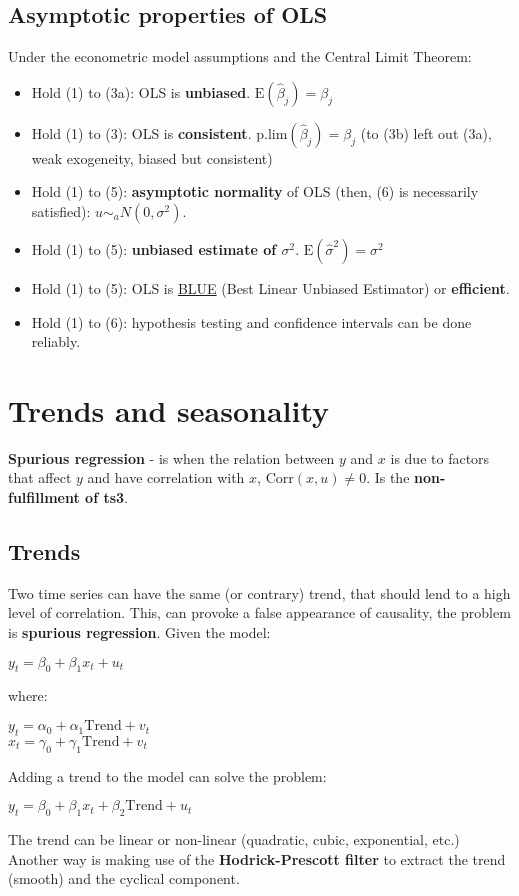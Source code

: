 \documentclass[10pt, a4paper, landscape]{extarticle}
\newcommand{\E}{\mathrm{E}}
\newcommand{\Corr}{\mathrm{Corr}}
\begin{document}
\begin{multicols}{3}
	\subsection*{Asymptotic properties of OLS}
		Under the econometric model assumptions and the Central Limit Theorem:
		\begin{itemize}[leftmargin=*]
			\item Hold (1) to (3a): OLS is \textbf{unbiased}. $\E(\hat{\beta}_j) = \beta_j$
			\item Hold (1) to (3): OLS is \textbf{consistent}. $\mathrm{p.lim}(\hat{\beta}_j) = \beta_j$ (to (3b) left out (3a), weak exogeneity, biased but consistent)
			\item Hold (1) to (5): \textbf{asymptotic normality} of OLS (then, (6) is necessarily satisfied): $u \sim_a N(0,\sigma^2)$.
			\item Hold (1) to (5): \textbf{unbiased estimate of $\sigma^2$}. $\E(\hat{\sigma}^2) = \sigma^2$
			\item Hold (1) to (5): OLS is \textcolor{blue}{\href{https://www.youtube.com/watch?v=68ugkg9RePc}{BLUE}} (Best Linear Unbiased Estimator) or \textbf{efficient}. 
			\item Hold (1) to (6): hypothesis testing and confidence intervals can be done reliably.
		\end{itemize}
\columnbreak
\section*{Trends and seasonality}
	\textbf{Spurious regression} - is when the relation between $y$ and $x$ is due to factors that affect $y$ and have correlation with $x$, $\Corr(x, u) \neq 0$. Is the \textbf{non-fulfillment of ts3}.
	\subsection*{Trends}
		Two time series can have the same (or contrary) trend, that should lend to a high level of correlation. This, can provoke a false appearance of causality, the problem is \textbf{spurious regression}. Given the model:
		\begin{center}
			$y_t = \beta_0 + \beta_1 x_t + u_t$
		\end{center}
		where:
		\begin{center}
			$y_t = \alpha_0 + \alpha_1 \mathrm{Trend} + v_t$ \\
			$x_t = \gamma_0 + \gamma_1 \mathrm{Trend} + v_t$
		\end{center}
		Adding a trend to the model can solve the problem:
		\begin{center}
			$y_t = \beta_0 + \beta_1 x_t + \beta_2 \mathrm{Trend} + u_t$
		\end{center}
		The trend can be linear or non-linear (quadratic, cubic, exponential, etc.) \\
		Another way is making use of the \textbf{Hodrick-Prescott filter} to extract the trend (smooth) and the cyclical component.

\end{multicols}
\end{document}
